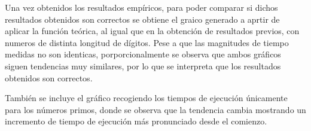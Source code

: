 \begin{figure}[H]
\end{figure}

Una vez obtenidos los resultados empíricos, para poder comparar si dichos resultados obtenidos son correctos se obtiene el graico generado a aprtir de aplicar la función teórica, al igual que en la obtención de resultados previos, con numeros de distinta longitud de dígitos. Pese a que las magnitudes de tiempo medidas no son identicas, porporcionalmente se observa que ambos gráficos siguen tendencias muy similares, por lo que se interpreta que los resultados obtenidos son correctos.

\begin{figure}[H]
\end{figure}

También se incluye el gráfico recogiendo los tiempos de ejecución únicamente para los números primos, donde se observa que la tendencia cambia mostrando un incremento de tiempo de ejecución más pronunciado desde el comienzo.
\begin{figure}[H]
\end{figure}

